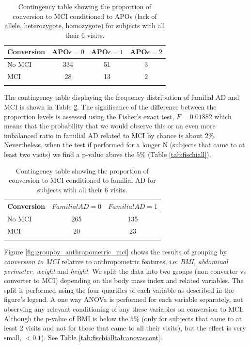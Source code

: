 \documentclass[11pt]{article}
\theoremstyle{definition}
\theoremstyle{remark}
\begin{document}
\begin{table}[ht]
\centering
\caption{Contingency table showing the proportion of conversion to MCI conditioned to APO$\epsilon$ (lack of allele, heterozygote, homozygote) for subjects with all their 6 visits.}
\begin{tabular}[t]{lccc}
\hline
Conversion&APO$\epsilon=0$&APO$\epsilon=1$&APO$\epsilon=2$ \\
\hline
No MCI&334&51&3\\
MCI&28&13&2\\
\hline
\label{tab:apoemci}
\end{tabular}
\end{table}%

The contingency table displaying the frequency distribution of familial AD and MCI is shown in Table \ref{tab:famimci}. The significance of the difference between the proportion levels is assessed using the Fisher's exact test, $F = 0.01882$ which means that the probability that we would observe this or an even more imbalanced ratio in familial AD related to MCI by chance is about $2\%$. Nevertheless, when the test if performed for a longer N (subjects that came to at least two visits) we find a p-value above the $5\%$ (Table \ref{tab:fischiall}).

\begin{table}[ht]
\centering
\caption{Contingency table showing the proportion of conversion to MCI conditioned to familial AD for subjects with all their 6 visits.}
\begin{tabular}[t]{lcc}
\hline
Conversion&{$FamilialAD=0$}&{$FamilialAD=1$} \\
\hline
No MCI&265&135\\
MCI&20&23\\
\hline
\label{tab:famimci}
\end{tabular}
\end{table}%

Figure \ref{fig:groupby_anthropometric_mci} shows the results of grouping by \emph{conversion to MCI} relative to anthropometric features, i.e: \emph{BMI, abdominal perimeter, weight} and \emph{height}. We split the data into two groups (non converter vs converter to MCI) depending on the body mass index and related variables. The split is performed using the four quartiles of each variable as described in the figure's legend.
A one way ANOVa is performed for each variable separately, not observing any relevant conditioning of any these variables on conversion to MCI. Although the p-value of BMI is below the $5\%$ (only for subjects that came to at least 2 visits and not for those that came to all their visits), but the effect is very small, $<0.1$). See Table \ref{tab:fischialltab:anovascont}.
\end{document}

